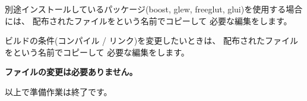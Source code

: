 別途インストールしているパッケージ(boost, glew, freeglut, glui)を使用する場合には、
配布されたファイルを\QCMakeConf{}という名前でコピーして
必要な編集をします。

\medskip
ビルドの条件(コンパイル / リンク)を変更したいときは、
配布されたファイルを\QCMakeOpts{}という名前でコピーして
必要な編集をします。

\medskip
\bf{ファイル\QCMakeLists{}の変更は必要ありません。}

\medskip
以上で準備作業は終了です。

